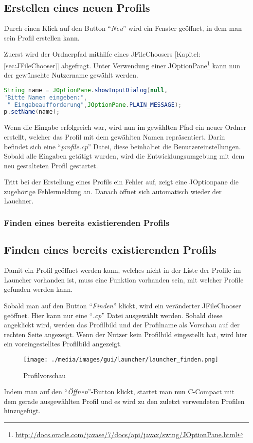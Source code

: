 	\subsection{Erstellen eines neuen Profils}
\fi
Durch einen Klick auf den Button "`\textit{Neu}"' wird ein Fenster geöffnet, in dem man sein Profil erstellen kann.  

Zuerst wird der Ordnerpfad mithilfe eines JFileChoosers [Kapitel: \ref{sec:JFileChooser}] abgefragt. Unter Verwendung einer JOptionPane\footnote{\url{http://docs.oracle.com/javase/7/docs/api/javax/swing/JOptionPane.html}}  kann nun der gewünschte Nutzername gewählt werden. 
\begin{lstlisting}[language=JAVA]
String name = JOptionPane.showInputDialog(null,
"Bitte Namen eingeben:",
 " Eingabeaufforderung",JOptionPane.PLAIN_MESSAGE);
p.setName(name);
\end{lstlisting}

Wenn die Eingabe erfolgreich war, wird nun im gewählten Pfad ein neuer Ordner erstellt, welcher das Profil mit dem gewählten Namen repräsentiert. Darin befindet sich eine "`\textit{profile.cp}"' Datei, diese beinhaltet die Benutzereinstellungen. Sobald alle Eingaben getätigt wurden, wird die Entwicklungsumgebung mit dem neu gestalteten Profil gestartet.

Tritt bei der Erstellung eines Profils ein Fehler auf, zeigt eine JOptionpane die zugehörige Fehlermeldung an. Danach öffnet sich automatisch wieder der Lauchner. 

\iffabian
	\subsubsection*{Finden eines bereits existierenden Profils}
\else
	\subsection{Finden eines bereits existierenden Profils}
\fi
Damit ein Profil geöffnet werden kann, welches nicht in der Liste der Profile im Launcher vorhanden ist, muss eine Funktion vorhanden sein, mit welcher Profile gefunden werden kann.

Sobald man auf den Button "`\textit{Finden}"' klickt, wird ein veränderter JFileChooser geöffnet. Hier kann nur eine "`\textit{.cp}"' Datei ausgewählt werden. Sobald diese angeklickt wird, werden das Profilbild und der Profilname als Vorschau auf der rechten Seite angezeigt. Wenn der Nutzer kein Profilbild eingestellt hat, wird hier ein voreingestelltes Profilbild angezeigt.

\begin{figure}[h] 
   \centering
     \texttt{[image: ./media/images/gui/launcher/launcher\_finden.png]}
  \caption{ Profilvorschau}
  \label{fig:Bild1}
\end{figure}

Indem man auf den "`\textit{Öffnen}"'-Button klickt, startet man nun C-Compact mit dem gerade ausgewählten Profil und es wird zu den zuletzt verwendeten Profilen hinzugefügt.
